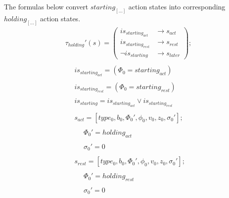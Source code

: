 \documentclass{acm_proc_article-sp}
\begin{document}
The formulas below convert $starting_{[...]}$ action states into corresponding 
$holding_{[...]}$ action states.  
\begin{displaymath} \begin{array}{l}
\tau_{holding}'(s) = \left( \begin{array}{ll} is_{starting_{act}}  & \rightarrow s_{act} \\
                                              is_{starting_{rest}} & \rightarrow s_{rest} \\
                                              \neg is_{starting}   & \rightarrow s_{later} \end{array} \right); \\
\\
\hspace{16pt} is_{starting_{act}} = (\Phi_0 = starting_{act}) \\
\\
\hspace{16pt} is_{starting_{rest}} = (\Phi_0 = starting_{rest}) \\
\\
\hspace{16pt} is_{starting} = is_{starting_{act}} \vee is_{starting_{rest}} \\
\\
\hspace{16pt} s_{act} = [type_0, b_0, \Phi_0', \phi_0, v_0, z_0, \sigma_0']; \\
\\
\hspace{16pt} \hspace{16pt} \Phi_0' = holding_{act} \\
\\
\hspace{16pt} \hspace{16pt} \sigma_0' = 0 \\
\\
\hspace{16pt} s_{rest} = [type_0, b_0, \Phi_0', \phi_0, v_0, z_0, \sigma_0']; \\
\\
\hspace{16pt} \hspace{16pt} \Phi_0' = holding_{rest} \\
\\
\hspace{16pt} \hspace{16pt} \sigma_0' = 0 \\
\\

\end{array}
\end{displaymath}
\end{document}
